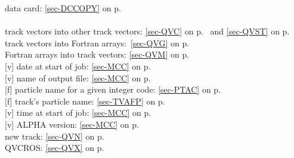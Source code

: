 data card: \ref{sec-DCCOPY} on p.~\pageref{sec-DCCOPY}\\
 \\
 \mysubitem track vectors into other track vectors:
 \ref{sec-QVC} on p.~\pageref{sec-QVC} and \ref{sec-QVST} on p.~\pageref{sec-QVST}\\
 \mysubitem track vectors into Fortran arrays:~\ref{sec-QVG} on p.~\pageref{sec-QVG}\\
 \mysubitem Fortran arrays into track vectors: \ref{sec-QVM} on p.~\pageref{sec-QVM}\\
 [v] date at start of job: \ref{sec-MCC} on p.~\pageref{sec-MCC}\\
 [v] name of output file: \ref{sec-MCC} on p.~\pageref{sec-MCC}\\
 [f] particle name for a given integer code:
 \ref{sec-PTAC} on p.~\pageref{sec-PTAC}\\
 [f] track's particle name: \ref{sec-TVAFP} on p.~\pageref{sec-TVAFP}\\
 [v] time at start of job: \ref{sec-MCC} on p.~\pageref{sec-MCC}\\
 [v] ALPHA version: \ref{sec-MCC} on p.~\pageref{sec-MCC}\\
 new track: \ref{sec-QVN} on p.~\pageref{sec-QVN}\\
 QVCROS: \ref{sec-QVX} on p.~\pageref{sec-QVX}
 

